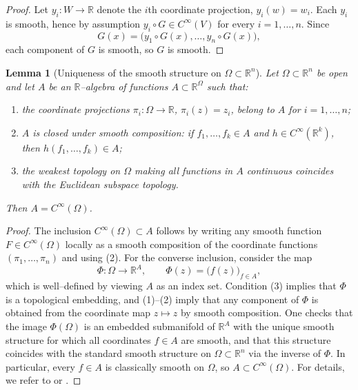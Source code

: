 \documentclass[11pt]{amsart}
\newtheorem{lemma}[theorem]{Lemma}
\theoremstyle{definition}
\theoremstyle{remark}
\begin{document}
\begin{proof}
Let $y_i:W\to\mathbb{R}$ denote the $i$th coordinate projection, $y_i(w)=w_i$.
Each $y_i$ is smooth, hence by assumption $y_i\circ G\in C^\infty(V)$ for
every $i=1,\dots,n$. Since
\[
G(x) = \bigl(y_1\circ G(x),\dots,y_n\circ G(x)\bigr),
\]
each component of $G$ is smooth, so $G$ is smooth. \qedhere
\end{proof}

\begin{lemma}[Uniqueness of the smooth structure on $\Omega\subset\mathbb{R}^n$]
\label{lem:uniqueness-smooth-structure-Rn}
Let $\Omega\subset\mathbb{R}^n$ be open and let $A$ be an $\mathbb{R}$--algebra of
functions $A\subset \mathbb{R}^\Omega$ such that:
\begin{enumerate}
\item the coordinate projections $\pi_i:\Omega\to\mathbb{R}$, $\pi_i(z)=z_i$, belong to $A$ for $i=1,\dots,n$;
\item $A$ is closed under smooth composition: if $f_1,\dots,f_k\in A$ and
      $h\in C^\infty(\mathbb{R}^k)$, then $h(f_1,\dots,f_k)\in A$;
\item the weakest topology on $\Omega$ making all functions in $A$ continuous
      coincides with the Euclidean subspace topology.
\end{enumerate}
Then $A = C^\infty(\Omega)$.
\end{lemma}

\begin{proof}
The inclusion $C^\infty(\Omega)\subset A$ follows by writing any smooth function
$F\in C^\infty(\Omega)$ locally as a smooth composition of the coordinate
functions $(\pi_1,\dots,\pi_n)$ and using (2). For the converse inclusion, consider
the map
\[
\Phi:\Omega \longrightarrow \mathbb{R}^A,\qquad
\Phi(z) = \bigl(f(z)\bigr)_{f\in A},
\]
which is well--defined by viewing $A$ as an index set. Condition (3) implies that
$\Phi$ is a topological embedding, and (1)--(2) imply that any component of $\Phi$
is obtained from the coordinate map $z\mapsto z$ by smooth composition. One
checks that the image $\Phi(\Omega)$ is an embedded submanifold of $\mathbb{R}^A$
with the unique smooth structure for which all coordinates $f\in A$ are smooth,
and that this structure coincides with the standard smooth structure on
$\Omega\subset\mathbb{R}^n$ via the inverse of $\Phi$. In particular, every
$f\in A$ is classically smooth on $\Omega$, so $A\subset C^\infty(\Omega)$.
For details, we refer to \cite{sikorski1967differential} or \cite{Nestruev03}.
\end{proof}
\end{document}
